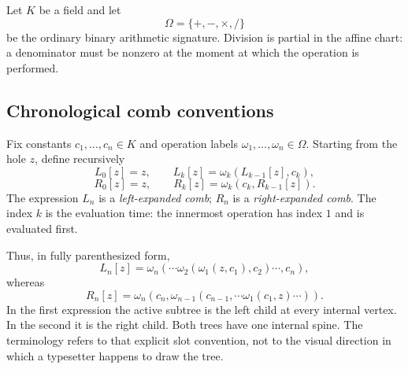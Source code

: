 Let $K$ be a field and let
\[
  \Omega=\{+,-,\times,/\}
\]
be the ordinary binary arithmetic signature.  Division is partial in the
affine chart: a denominator must be nonzero at the moment at which the
operation is performed.

\subsection{Chronological comb conventions}

\begin{definition}
\label{def:p0-left-right-combs}
Fix constants $c_1,\ldots,c_n\in K$ and operation labels
$\omega_1,\ldots,\omega_n\in\Omega$.  Starting from the hole $z$, define
recursively
\begin{equation}\label{eq:p0-comb-recursions}
  L_0[z]=z,
  \qquad
  L_k[z]=\omega_k(L_{k-1}[z],c_k),
\end{equation}
\begin{equation}\label{eq:p0-right-comb-recursions}
  R_0[z]=z,
  \qquad
  R_k[z]=\omega_k(c_k,R_{k-1}[z]).
\end{equation}
The expression $L_n$ is a \emph{left-expanded comb}; $R_n$ is a
\emph{right-expanded comb}.  The index $k$ is the evaluation time: the
innermost operation has index $1$ and is evaluated first.
\end{definition}

Thus, in fully parenthesized form,
\[
  L_n[z]
  =\omega_n(\cdots\omega_2(\omega_1(z,c_1),c_2)\cdots,c_n),
\]
whereas
\[
  R_n[z]
  =\omega_n(c_n,\omega_{n-1}(c_{n-1},\cdots\omega_1(c_1,z)\cdots)).
\]
In the first expression the active subtree is the left child at every internal
vertex.  In the second it is the right child.  Both trees have one internal
spine.  The terminology refers to that explicit slot convention, not to the
visual direction in which a typesetter happens to draw the tree.

